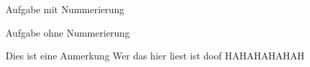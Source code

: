 




\makeHeader
\begin{exercise}{ Aufgabe mit Nummerierung }
\end{exercise}


\begin{blankexercise} { Aufgabe ohne Nummerierung  }
\end{blankexercise}


\begin{blankexercise} {}
\end{blankexercise}


\begin{solution}
    
\end{solution}


\begin{blanksolution}
    
\end{blanksolution}


\begin{note} {Dies ist eine Anmerkung}
    Wer das hier liest ist doof HAHAHAHAHAH 
\end{note}


